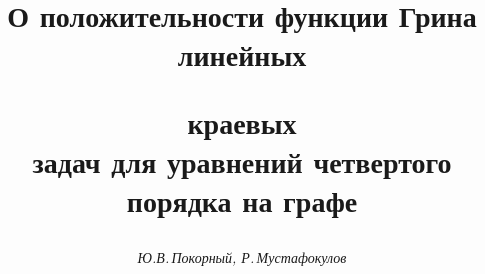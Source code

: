 






\newcommand{\const}{\operatorname{const}}







 


\setcounter{page}{75}















\author{\it Ю.В.\,Покорный, Р.\,Мустафокулов}




\title{О положительности функции Грина линейных


краевых\\ задач для уравнений четвертого порядка на графе}





\date{}




\pagestyle{plain} %







\maketitle


